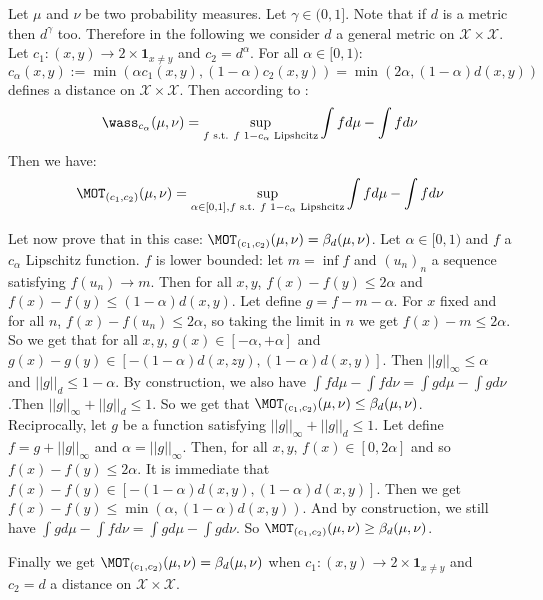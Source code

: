 \begin{prv*} 
Let $\mu$ and $\nu$ be two probability measures. Let $\gamma\in (0,1]$. Note that if $d$ is a metric then $d^\gamma$ too. Therefore in the following we consider $d$ a general metric on $\mathcal{X}\times\mathcal{X}$. Let $c_1:(x,y)\rightarrow2\times \mathbf{1}_{x\neq y}$ and $c_2=d^{\alpha}$. For all $\alpha\in[0,1)$:
$$c_\alpha(x,y) := \min(\alpha c_1(x,y),(1-\alpha)c_2(x,y))=\min(2\alpha,(1-\alpha)d(x,y))$$
defines a distance on  $\mathcal{X}\times\mathcal{X}$. Then according to \cite{villani2003topics}: 
$$\wass_{c_\alpha}(\mu,\nu)=\sup_{f\text{ s.t. } f\text{ }1-c_\alpha\text{ Lipshcitz}}\int fd\mu-\int fd\nu$$
Then we have:
$$\MOT_{(c_1,c_2)}(\mu,\nu) = \sup_{\alpha\in[0,1],f\text{ s.t. } f\text{ }1-c_\alpha\text{ Lipshcitz}}\int fd\mu-\int fd\nu$$

Let now prove that in this case: $\MOT_{(c_1,c_2)}(\mu,\nu) = \beta_d(\mu,\nu)$. Let $\alpha \in [0,1)$ and $f$ a $c_\alpha$ Lipschitz function. $f$ is lower bounded: let $m = \inf f$ and $(u_n)_n$ a sequence satisfying $f(u_n)\rightarrow m$. Then for all $x,y$, $f(x)-f(y)\leq2\alpha$ and  $f(x)-f(y)\leq(1-\alpha)d(x,y)$. Let define $g=f-m-\alpha$. For $x$ fixed and for all $n$,  $f(x)-f(u_n)\leq2\alpha$, so taking the limit in $n$ we get $f(x)-m\leq2\alpha$.  So we get that for all $x,y$, $g(x)\in[-\alpha,+\alpha]$ and $g(x)-g(y)\in[-(1-\alpha)d(x,zy),(1-\alpha)d(x,y)]$. Then $||g||_\infty\leq \alpha$ and $||g||_d\leq 1-\alpha$. By construction, we also have $\int fd\mu-\int fd\nu=\int gd\mu-\int gd\nu$.Then $||g||_\infty+||g||_d\leq 1$. So we get that $\MOT_{(c_1,c_2)}(\mu,\nu) \leq \beta_d(\mu,\nu)$.\\
Reciprocally, let $g$ be a function satisfying $||g||_\infty+||g||_d\leq 1$. Let define $f=g+||g||_\infty$ and $\alpha = ||g||_\infty$. Then, for all $x,y$, $f(x)\in[0,2\alpha]$ and so $f(x)-f(y)\leq 2\alpha$. It is immediate that $f(x)-f(y)\in[-(1-\alpha)d(x,y),(1-\alpha)d(x,y)]$. Then we get $f(x)-f(y)\leq \min(\alpha,(1-\alpha)d(x,y))$. And by construction, we still have $\int gd\mu-\int fd\nu=\int gd\mu-\int gd\nu$. So $\MOT_{(c_1,c_2)}(\mu,\nu) \geq \beta_d(\mu,\nu)$.

\medskip

Finally we get $\MOT_{(c_1,c_2)}(\mu,\nu) = \beta_d(\mu,\nu)$ when $c_1:(x,y)\rightarrow2\times \mathbf{1}_{x\neq y}$ and $c_2=d$ a distance on $\mathcal{X}\times\mathcal{X}$.
\end{prv*}



